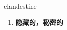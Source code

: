 
\begin{frame}
{\huge clandestine}
\begin{center}
\begin{enumerate}\Large
  \item \textbf{隐藏的，秘密的}
\end{enumerate}
\end{center}
\end{frame}
